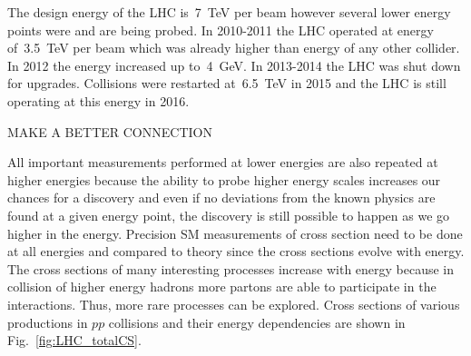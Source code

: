 

The design energy of the LHC is~7~TeV per beam however several lower energy points were and are being probed. In 2010-2011 the LHC operated at energy of~3.5~TeV per beam which was already higher than energy of any other collider. In 2012 the energy increased up to~4~GeV. In 2013-2014 the LHC was shut down for upgrades. Collisions were restarted at~6.5~TeV in 2015 and the LHC is still operating at this energy in 2016. 

MAKE A BETTER CONNECTION

All important measurements performed at lower energies are also repeated at higher energies because the ability to probe higher energy scales increases our chances for a discovery and even if no deviations from the known physics are found at a given energy point, the discovery is still possible to happen as we go higher in the energy. Precision SM measurements of cross section need to be done at all energies and compared to theory since the cross sections evolve with energy. The cross sections of many interesting processes increase with energy because in collision of higher energy hadrons more partons are able to participate in the interactions. Thus, more rare processes can be explored. Cross sections of various productions in $pp$ collisions and their energy dependencies are shown in Fig.~\ref{fig:LHC_totalCS}.

